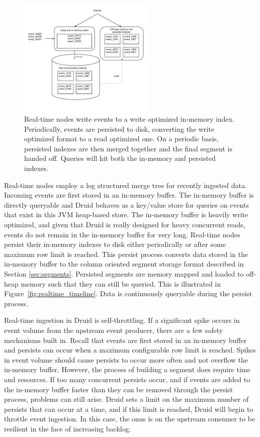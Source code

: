 \documentclass{vldb}
\begin{document}
\begin{figure}
\centering
\includegraphics[width = 2.6in]{realtime_flow} 
\caption{
Real-time nodes write events to a write optimized in-memory index.
Periodically, events are persisted to disk, converting the write optimized
format to a read optimized one. On a periodic basis, persisted indexes are
then merged together and the final segment is handed off.  Queries will hit
both the in-memory and persisted indexes.  
}
\label{fig:realtime_flow}
\end{figure}

Real-time nodes employ a log structured merge tree\cite{o1996log} for recently
ingested data. Incoming events are first stored in an in-memory buffer. The
in-memory buffer is directly queryable and Druid behaves as a key/value store for
queries on events that exist in this JVM heap-based store. The in-memory buffer
is heavily write optimized, and given that Druid is really designed for heavy
concurrent reads, events do not remain in the in-memory buffer for very long.
Real-time nodes persist their in-memory indexes to disk either periodically or
after some maximum row limit is reached. This persist process converts data
stored in the in-memory buffer to the column oriented segment storage format
described in Section \ref{sec:segments}.  Persisted segments are memory mapped
and loaded to off-heap memory such that they can still be queried. This is
illustrated in Figure~\ref{fig:realtime_timeline}. Data is continuously
queryable during the persist process.

Real-time ingestion in Druid is self-throttling. If a significant spike occurs
in event volume from the upstream event producer, there are
a few safety mechanisms built in. Recall that events are first stored in an
in-memory buffer and persists can occur when a maximum configurable row limit
is reached. Spikes in event volume should cause persists to occur more often
and not overflow the in-memory buffer. However, the process of building a
segment does require time and resources. If too many concurrent persists occur,
and if events are added to the in-memory buffer faster than they can be removed
through the persist process, problems can still arise. Druid sets a limit on
the maximum number of persists that can occur at a time, and if this limit is
reached, Druid will begin to throttle event ingestion. In this case, the onus
is on the upstream consumer to be resilient in the face of increasing backlog.
\end{document}
